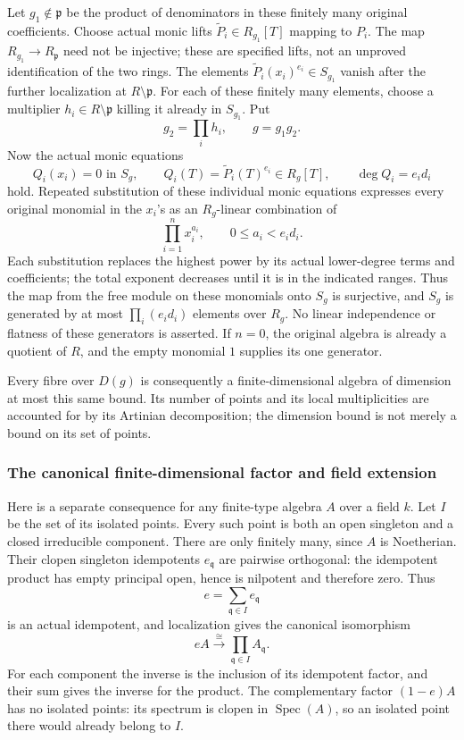 Let \(g_1\notin\mathfrak p\) be the product of denominators in these finitely many original coefficients. Choose actual monic lifts \(\widetilde P_i\in R_{g_1}[T]\) mapping to \(P_i\). The map \(R_{g_1}\to R_{\mathfrak p}\) need not be injective; these are specified lifts, not an unproved identification of the two rings. The elements \(\widetilde P_i(x_i)^{e_i}\in S_{g_1}\) vanish after the further localization at \(R\setminus\mathfrak p\). For each of these finitely many elements, choose a multiplier \(h_i\in R\setminus\mathfrak p\) killing it already in \(S_{g_1}\). Put \[
 g_2=\prod_i h_i,\qquad g=g_1g_2.
\] Now the actual monic equations \[
 Q_i(x_i)=0\text{ in }S_g,\qquad
 Q_i(T)=\widetilde P_i(T)^{e_i}\in R_g[T],\qquad
 \deg Q_i=e_id_i
\] hold. Repeated substitution of these individual monic equations expresses every original monomial in the \(x_i\)'s as an \(R_g\)-linear combination of \[
 \prod_{i=1}^n x_i^{a_i},
 \qquad 0\le a_i<e_id_i.
\] Each substitution replaces the highest power by its actual lower-degree terms and coefficients; the total exponent decreases until it is in the indicated ranges. Thus the map from the free module on these monomials onto \(S_g\) is surjective, and \(S_g\) is generated by at most \(\prod_i(e_id_i)\) elements over \(R_g\). No linear independence or flatness of these generators is asserted. If \(n=0\), the original algebra is already a quotient of \(R\), and the empty monomial \(1\) supplies its one generator.

Every fibre over \(D(g)\) is consequently a finite-dimensional algebra of dimension at most this same bound. Its number of points and its local multiplicities are accounted for by its Artinian decomposition; the dimension bound is not merely a bound on its set of points.

\subsubsection{The canonical finite-dimensional factor and field extension}\label{algebra-proof-031-the-canonical-finite-dimensional-factor-and-field-extension}

Here is a separate consequence for any finite-type algebra \(A\) over a field \(k\). Let \(I\) be the set of its isolated points. Every such point is both an open singleton and a closed irreducible component. There are only finitely many, since \(A\) is Noetherian. Their clopen singleton idempotents \(e_{\mathfrak q}\) are pairwise orthogonal: the idempotent product has empty principal open, hence is nilpotent and therefore zero. Thus \[
 e=\sum_{\mathfrak q\in I}e_{\mathfrak q}
\] is an actual idempotent, and localization gives the canonical isomorphism \[
 eA\xrightarrow{\cong}\prod_{\mathfrak q\in I}A_{\mathfrak q}.
\] For each component the inverse is the inclusion of its idempotent factor, and their sum gives the inverse for the product. The complementary factor \((1-e)A\) has no isolated points: its spectrum is clopen in \(\operatorname{Spec}(A)\), so an isolated point there would already belong to \(I\).

